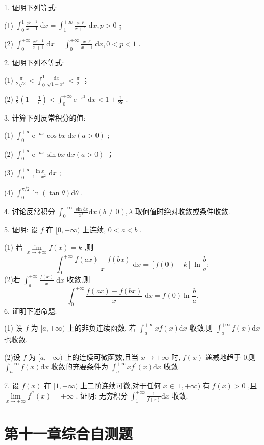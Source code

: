 1. 证明下列等式:

(1) \({\int }_{0}^{1}\frac{{x}^{p - 1}}{x + 1}\mathrm{\;d}x = {\int }_{1}^{+\infty }\frac{{x}^{-p}}{x + 1}\mathrm{\;d}x,p > 0\) ;

(2) \({\int }_{0}^{+\infty }\frac{{x}^{p - 1}}{x + 1}\mathrm{\;d}x = {\int }_{0}^{+\infty }\frac{{x}^{-p}}{x + 1}\mathrm{\;d}x,0 < p < 1\) .

2. 证明下列不等式:

(1) \(\frac{\pi }{2\sqrt{2}} < {\int }_{0}^{1}\frac{\mathrm{d}x}{\sqrt{1 - {x}^{4}}} < \frac{\pi }{2}\) ；

(2) \(\frac{1}{2}\left( {1 - \frac{1}{\mathrm{e}}}\right)  < {\int }_{0}^{+\infty }{\mathrm{e}}^{-{x}^{2}}\mathrm{\;d}x < 1 + \frac{1}{2\mathrm{e}}\) .

3. 计算下列反常积分的值:

(1) \({\int }_{0}^{+\infty }{\mathrm{e}}^{-{ax}}\cos {bx}\mathrm{\;d}x\left( {a > 0}\right)\) ;

(2) \({\int }_{0}^{+\infty }{\mathrm{e}}^{-{ax}}\sin {bx}\mathrm{\;d}x\left( {a > 0}\right)\) ；

(3) \({\int }_{0}^{+\infty }\frac{\ln x}{1 + {x}^{2}}\mathrm{\;d}x\) ;

(4) \({\int }_{0}^{\pi /2}\ln \left( {\tan \theta }\right) \mathrm{d}\theta\) .

4. 讨论反常积分 \({\int }_{0}^{+\infty }\frac{\sin {bx}}{{x}^{\lambda }}\mathrm{d}x\left( {b \neq  0}\right) ,\lambda\) 取何值时绝对收敛或条件收敛.

5. 证明: 设 \(f\) 在 \(\lbrack 0, + \infty )\) 上连续, \(0 < a < b\) .

(1) 若 \(\mathop{\lim }\limits_{{x \rightarrow   + \infty }}f\left( x\right)  = k\) ,则
\[
{\int }_{0}^{+\infty }\frac{f\left( {ax}\right)  - f\left( {bx}\right) }{x}\mathrm{\;d}x = \left\lbrack  {f\left( 0\right)  - k}\right\rbrack  \ln \frac{b}{a};
\]
(2)若 \({\int }_{a}^{+\infty }\frac{f\left( x\right) }{x}\mathrm{\;d}x\) 收敛,则
\[
{\int }_{0}^{+\infty }\frac{f\left( {ax}\right)  - f\left( {bx}\right) }{x}\mathrm{\;d}x = f\left( 0\right) \ln \frac{b}{a}.
\]
6. 证明下述命题:

(1) 设 \(f\) 为 \(\lbrack a, + \infty )\) 上的非负连续函数. 若 \({\int }_{a}^{+\infty }{xf}\left( x\right) \mathrm{d}x\) 收敛,则 \({\int }_{a}^{+\infty }f\left( x\right) \mathrm{d}x\) 也收敛.

(2)设 \(f\) 为 \(\lbrack a, + \infty )\) 上的连续可微函数,且当 \(x \rightarrow   + \infty\) 时, \(f\left( x\right)\) 递减地趋于 0,则 \({\int }_{a}^{+\infty }f\left( x\right) \mathrm{d}x\) 收敛的充要条件为 \({\int }_{a}^{+\infty }x{f}^{\prime }\left( x\right) \mathrm{d}x\) 收敛.

7. 设 \(f\left( x\right)\) 在 \(\lbrack 1, + \infty )\) 上二阶连续可微,对于任何 \(x \in  \lbrack 1, + \infty )\) 有 \(f\left( x\right)  > 0\) ,且 \(\mathop{\lim }\limits_{{x \rightarrow   + \infty }}{f}^{\prime \prime }\left( x\right)  =  + \infty\) . 证明: 无穷积分 \({\int }_{1}^{+\infty }\frac{1}{f\left( x\right) }\mathrm{d}x\) 收敛.

\section{第十一章综合自测题}


